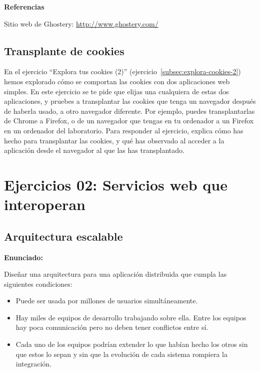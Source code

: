 \textbf{Referencias}

Sitio web de Ghostery: \url{http://www.ghostery.com/}

\subsection{Transplante de cookies}
\label{subsec:transplante-cookies}

En el ejercicio ``Explora tus cookies (2)'' (ejercicio~\ref{subsec:explora-cookies-2}) hemos explorado cómo se comportan las cookies con dos aplicaciones web simples. En este ejercicio se te pide que elijas una cualquiera de estas dos aplicaciones, y pruebes a transplantar las cookies que tenga un navegador después de haberla usado, a otro navegador diferente. Por ejemplo, puedes transplantarlas de Chrome a Firefox, o de un navegador que tengas en tu ordenador a un Firefox en un ordenador del laboratorio. Para responder al ejercicio, explica cómo has hecho para transplantar las cookies, y qué has observado al acceder a la aplicación desde el navegador al que las has transplantado.


\section{Ejercicios 02: Servicios web que interoperan}


\subsection{Arquitectura escalable}
\label{subsec:arq-escalable}

\textbf{Enunciado:}

Diseñar una arquitectura para una aplicación distribuida que cumpla las siguientes condiciones:

\begin{itemize}
\item Puede ser usada por millones de usuarios simultáneamente.
\item Hay miles de equipos de desarrollo trabajando sobre ella. Entre los equipos hay poca comunicación pero no deben tener conflictos entre sí.
\item Cada uno de los equipos podrían extender lo que habían hecho los otros sin que estos lo sepan y sin que la evolución de cada sistema rompiera la integración.
\end{itemize}

